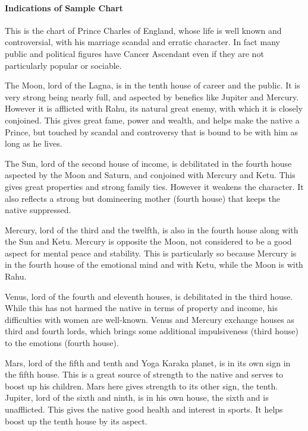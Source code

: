 \paragraph{Indications of Sample Chart}

 

This is the chart of Prince Charles of England, whose life is well known and controversial, with his marriage scandal and erratic character. In fact many public and political figures have Cancer Ascendant even if they are not particularly popular or sociable.

 

The Moon, lord of the Lagna, is in the tenth house of career and the public. It is very strong being nearly full, and aspected by benefics like Jupiter and Mercury. However it is afflicted with Rahu, its natural great enemy, with which it is closely conjoined. This gives great fame, power and wealth, and helps make the native a Prince, but touched by scandal and controversy that is bound to be with him as long as he lives.

 

The Sun, lord of the second house of income, is debilitated in the fourth house aspected by the Moon and Saturn, and conjoined with Mercury and Ketu. This gives great properties and strong family ties. However it weakens the character. It also reflects a strong but domineering mother (fourth house) that keeps the native suppressed.

 

Mercury, lord of the third and the twelfth, is also in the fourth house along with the Sun and Ketu. Mercury is opposite the Moon, not considered to be a good aspect for mental peace and stability. This is particularly so because Mercury is in the fourth house of the emotional mind and with Ketu, while the Moon is with Rahu.

 

Venus, lord of the fourth and eleventh houses, is debilitated in the third house. While this has not harmed the native in terms of property and income, his difficulties with women are well-known. Venus and Mercury exchange houses as third and fourth lords, which brings some additional impulsiveness (third house) to the emotions (fourth house).

 

Mars, lord of the fifth and tenth and Yoga Karaka planet, is in its own sign in the fifth house. This is a great source of strength to the native and serves to boost up his children. Mars here gives strength to its other sign, the tenth. Jupiter, lord of the sixth and ninth, is in his own house, the sixth and is unafflicted. This gives the native good health and interest in sports. It helps boost up the tenth house by its aspect.

